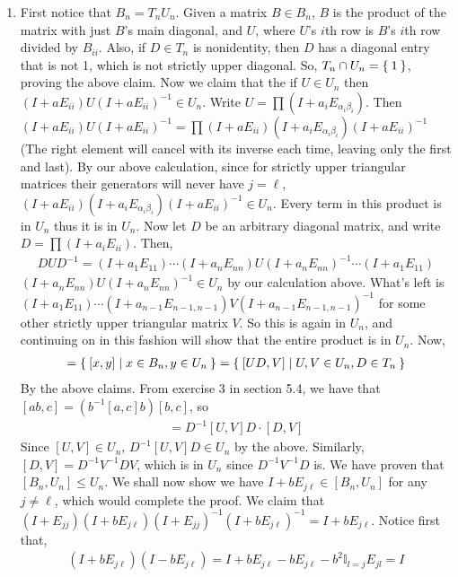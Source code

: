 \documentclass[12pt]{article}
\theoremstyle{definitionstyle}
\def\mbb#1{\mathbb{#1}}
\begin{document}
\begin{enumerate}[leftmargin=\labelsep]
\begin{enumerate}
			\item First notice that $B_n = T_n U_n$. Given a matrix $B \in B_n$, $B$ is the product of the matrix with just $B$'s main diagonal, and $U$, where $U$'s $i$th row is $B$'s $i$th row divided by $B_{ii}$. Also, if $D \in T_n$ is nonidentity, then $D$ has a diagonal entry that is not 1, which is not strictly upper diagonal. So, $T_n \cap U_n = \Set{1}$, proving the above claim. Now we claim that the if $U \in U_n$ then $(I+aE_{ii}) U (I+aE_{ii})^{-1} \in U_n$. Write $U = \prod (I + a_i E_{\alpha_i \beta_i})$. Then $(I+aE_{ii}) U (I+aE_{ii})^{-1} = \prod (I+aE_{ii}) (I + a_i E_{\alpha_i \beta_i}) (I+aE_{ii})^{-1}$ (The right element will cancel with its inverse each time, leaving only the first and last). By our above calculation, since for strictly upper triangular matrices their generators will never have $j = \ell$, $(I+aE_{ii}) (I + a_i E_{\alpha_i \beta_i}) (I+aE_{ii})^{-1} \in U_n$. Every term in this product is in $U_n$ thus it is in $U_n$. Now let $D$ be an arbitrary diagonal matrix, and write $D = \prod (I + a_{i}E_{ii})$. Then,
			\begin{align*}
				D U D^{-1} = (I + a_1E_{11}) \cdots (I+a_nE_{nn}) U (I+a_nE_{nn})^{-1} \cdots (I + a_1E_{11})
			\end{align*}
			$(I+a_nE_{nn}) U (I+a_nE_{nn})^{-1} \in U_n$ by our calculation above. What's left is $(I + a_1E_{11}) \cdots (I+a_{n-1}E_{n-1, n-1})V(I+a_{n-1}E_{n-1, n-1})^{-1}$ for some other strictly upper triangular matrix $V$. So this is again in $U_n$, and continuing on in this fashion will show that the entire product is in $U_n$. Now,
			\begin{align*}
				[B_n, U_n] = \Set{[x, y] | x \in B_n, y \in U_n} = \Set{[UD, V] | U, V \in U_n, D \in T_n}
			\end{align*}
			By the above claims. From exercise 3 in section 5.4, we have that $[ab, c] = (b^{-1}[a, c]b)[b, c]$, so
			\begin{align*}
				[UD, V] = D^{-1} [U, V] D \cdot [D, V]
			\end{align*}
			Since $[U, V] \in U_n$, $D^{-1} [U, V] D \in U_n$ by the above. Similarly, $[D, V] = D^{-1} V^{-1} D V$, which is in $U_n$ since $D^{-1} V^{-1} D$ is. We have proven that $[B_n, U_n] \leq U_n$. We shall now show we have $I+bE_{j\ell} \in [B_n, U_n]$ for any $j \neq \ell$, which would complete the proof. We claim that $(I+E_{jj})(I+bE_{j\ell})(I+E_{jj})^{-1}(I+bE_{j\ell})^{-1} = I+bE_{j\ell}$. Notice first that,
			\begin{align*}
				(I+bE_{j\ell})(I-bE_{j\ell}) = I + bE_{j\ell} - bE_{j\ell} - b^2\mbb I_{l=j} E_{jl} = I

\end{align*}
\end{enumerate}
\end{enumerate}
\end{document}
